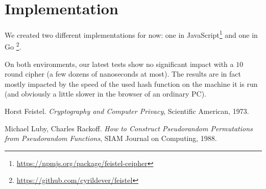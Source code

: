 \documentclass[twoside,twocolumn]{article}
\theoremstyle{definition}
\theoremstyle{remark}
\begin{document}
\section{Implementation}

We created two different implementations for now: one in JavaScript\footnote{\url{https://npmjs.org/package/feistel-ceipher}} and one in Go
\footnote{\url{https://github.com/cyrildever/feistel}}.

On both environments, our latest tests show no significant impact with a $10$ round cipher (a few dozens of nanoseconds at most). The results are in 
fact mostly impacted by the speed of the used hash function on the machine it is run (and obviously a little slower in the browser of an ordinary 
PC).

\vfill\eject %
\tableofcontents %


\begin{thebibliography}{99} %

Horst Feistel. \emph{Cryptography and Computer Privacy}, Scientific American, 1973.

Michael Luby, Charles Rackoff. \emph{How to Construct Pseudorandom Permutations from Pseudorandom Functions}, SIAM Journal on Computing, 1988.

\end{thebibliography}

\end{document}
